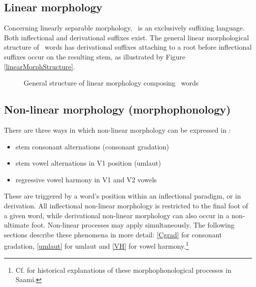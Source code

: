 \subsection{Linear morphology}\label{linearMorphology}
Concerning linearly separable morphology, \PS\ is an exclusively suffixing language. Both inflectional and derivational suffixes exist. %
The general linear morphological structure of \PS\ words has derivational suffixes attaching to a root before inflectional suffixes occur on the resulting stem, as illustrated by %
Figure \vref{linearMorphStructure}.
\begin{figure}[h]
\caption{General structure of linear morphology composing \PS\ words}\label{linearMorphStructure}
\end{figure}

%


\subsection{Non-linear morphology (morphophonology)}
There are three ways %
in which non-linear morphology can be expressed in \PS:
\begin{itemize}
\item{stem consonant alternations (consonant gradation)}
\item{stem vowel alternations in V1 position (umlaut)}
\item{regressive vowel harmony in V1 and V2 vowels}
\end{itemize}
These are triggered by a word’s position %
within an inflectional paradigm, or in derivation. All inflectional non-linear morphology is restricted to the final foot of a given word, while derivational non-linear morphology can also occur in a non-ultimate foot. Non-linear processes may apply simultaneously. The following sections describe these phenomena in more detail: \SEC\ref{Cgrad} for consonant gradation, \SEC\ref{umlaut} for umlaut and \SEC\ref{VH} for vowel harmony.\footnote{Cf. \citet{KorhonenM1969} for historical explanations of these morphophonological processes in Saami.} 


